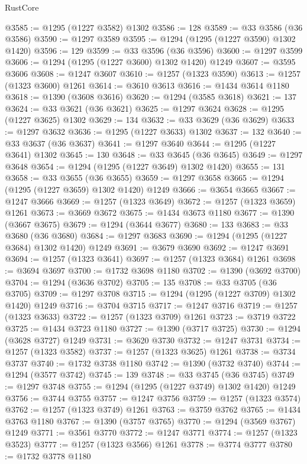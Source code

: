 \begin{lexlean}{RustCore}
\begin{coremodule}
@3585 := @1295 (@1227 @3582) @1302
@3586 := 128
@3589 := @33 @3586 (@36 @3586)
@3590 := @1297 @3589
@3595 := @1294 (@1295 (@1227 @3590) @1302 @1420)
@3596 := 129
@3599 := @33 @3596 (@36 @3596)
@3600 := @1297 @3599
@3606 := @1294 (@1295 (@1227 @3600) @1302 @1420) @1249
@3607 := @3595 @3606
@3608 := @1247 @3607
@3610 := @1257 (@1323 @3590)
@3613 := @1257 (@1323 @3600) @1261
@3614 := @3610 @3613
@3616 := @1434 @3614 @1180
@3618 := @1390 (@3608 @3616)
@3620 := @1294 (@3585 @3618)
@3621 := 137
@3624 := @33 @3621 (@36 @3621)
@3625 := @1297 @3624
@3628 := @1295 (@1227 @3625) @1302
@3629 := 134
@3632 := @33 @3629 (@36 @3629)
@3633 := @1297 @3632
@3636 := @1295 (@1227 @3633) @1302
@3637 := 132
@3640 := @33 @3637 (@36 @3637)
@3641 := @1297 @3640
@3644 := @1295 (@1227 @3641) @1302
@3645 := 130
@3648 := @33 @3645 (@36 @3645)
@3649 := @1297 @3648
@3654 := @1294 (@1295 (@1227 @3649) @1302 @1420)
@3655 := 131
@3658 := @33 @3655 (@36 @3655)
@3659 := @1297 @3658
@3665 := @1294 (@1295 (@1227 @3659) @1302 @1420) @1249
@3666 := @3654 @3665
@3667 := @1247 @3666
@3669 := @1257 (@1323 @3649)
@3672 := @1257 (@1323 @3659) @1261
@3673 := @3669 @3672
@3675 := @1434 @3673 @1180
@3677 := @1390 (@3667 @3675)
@3679 := @1294 (@3644 @3677)
@3680 := 133
@3683 := @33 @3680 (@36 @3680)
@3684 := @1297 @3683
@3690 := @1294 (@1295 (@1227 @3684) @1302 @1420) @1249
@3691 := @3679 @3690
@3692 := @1247 @3691
@3694 := @1257 (@1323 @3641)
@3697 := @1257 (@1323 @3684) @1261
@3698 := @3694 @3697
@3700 := @1732 @3698 @1180
@3702 := @1390 (@3692 @3700)
@3704 := @1294 (@3636 @3702)
@3705 := 135
@3708 := @33 @3705 (@36 @3705)
@3709 := @1297 @3708
@3715 := @1294 (@1295 (@1227 @3709) @1302 @1420) @1249
@3716 := @3704 @3715
@3717 := @1247 @3716
@3719 := @1257 (@1323 @3633)
@3722 := @1257 (@1323 @3709) @1261
@3723 := @3719 @3722
@3725 := @1434 @3723 @1180
@3727 := @1390 (@3717 @3725)
@3730 := @1294 (@3628 @3727) @1249
@3731 := @3620 @3730
@3732 := @1247 @3731
@3734 := @1257 (@1323 @3582)
@3737 := @1257 (@1323 @3625) @1261
@3738 := @3734 @3737
@3740 := @1732 @3738 @1180
@3742 := @1390 (@3732 @3740)
@3744 := @1294 (@3577 @3742)
@3745 := 139
@3748 := @33 @3745 (@36 @3745)
@3749 := @1297 @3748
@3755 := @1294 (@1295 (@1227 @3749) @1302 @1420) @1249
@3756 := @3744 @3755
@3757 := @1247 @3756
@3759 := @1257 (@1323 @3574)
@3762 := @1257 (@1323 @3749) @1261
@3763 := @3759 @3762
@3765 := @1434 @3763 @1180
@3767 := @1390 (@3757 @3765)
@3770 := @1294 (@3569 @3767) @1249
@3771 := @3561 @3770
@3772 := @1247 @3771
@3774 := @1257 (@1323 @3523)
@3777 := @1257 (@1323 @3566) @1261
@3778 := @3774 @3777
@3780 := @1732 @3778 @1180

\end{coremodule}
\end{lexlean}
